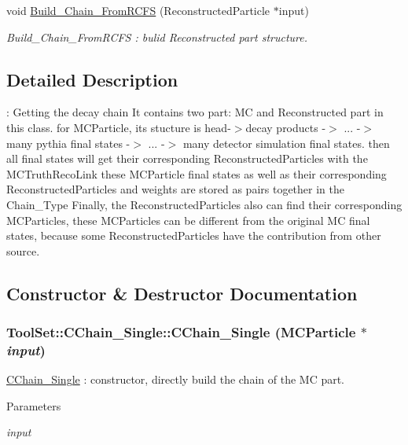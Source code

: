 \begin{DoxyCompactItemize}
void \hyperlink{classToolSet_1_1CChain__Single_ac351cca0dcac892111f0110a7be65eac}{Build\_\-Chain\_\-FromRCFS} (ReconstructedParticle $\ast$input)
\begin{DoxyCompactList}\small\item\em Build\_\-Chain\_\-FromRCFS : bulid Reconstructed part structure. \item\end{DoxyCompactList}\end{DoxyCompactItemize}


\subsection{Detailed Description}
: Getting the decay chain It contains two part: MC and Reconstructed part in this class. for MCParticle, its stucture is head-\/$>$decay products -\/$>$ ... -\/$>$ many pythia final states -\/$>$ ... -\/$>$ many detector simulation final states. then all final states will get their corresponding ReconstructedParticles with the MCTruthRecoLink these MCParticle final states as well as their corresponding ReconstructedParticles and weights are stored as pairs together in the Chain\_\-Type Finally, the ReconstructedParticles also can find their corresponding MCParticles, these MCParticles can be different from the original MC final states, because some ReconstructedParticles have the contribution from other source. 

\subsection{Constructor \& Destructor Documentation}
\hypertarget{classToolSet_1_1CChain__Single_a8e1e1a544c3fb42165a90e265205c614}{
\subsubsection[{CChain\_\-Single}]{\setlength{\rightskip}{0pt plus 5cm}ToolSet::CChain\_\-Single::CChain\_\-Single (MCParticle $\ast$ {\em input})}}
\label{classToolSet_1_1CChain__Single_a8e1e1a544c3fb42165a90e265205c614}


\hyperlink{classToolSet_1_1CChain__Single}{CChain\_\-Single} : constructor, directly build the chain of the MC part. 
\begin{DoxyParams}{Parameters}
\item[{\em input}]\end{DoxyParams}


